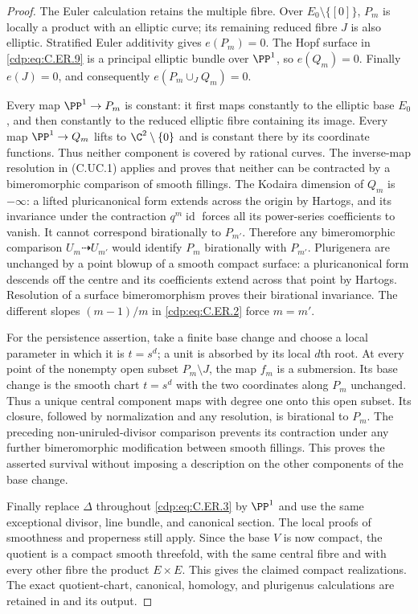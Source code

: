 \begin{proof}
The Euler calculation retains the multiple fibre. Over
$E_0\setminus\{[0]\}$, $P_m$ is locally a product with an elliptic
curve; its remaining reduced fibre $J$ is also elliptic.
Stratified Euler additivity gives $e(P_m)=0$.
The Hopf surface in \eqref{cdp:eq:C.ER.9} is a principal elliptic bundle over
$\PP^1$, so $e(Q_m)=0$. Finally $e(J)=0$, and consequently
$e(P_m\cup_JQ_m)=0$.

Every map $\PP^1\to P_m$ is constant: it first maps constantly
to the elliptic base $E_0$, and then constantly to the reduced
elliptic fibre containing its image. Every map $\PP^1\to Q_m$
lifts to $\C^2\setminus\{0\}$ and is constant there by its
coordinate functions. Thus neither component is covered by
rational curves. The inverse-map resolution in (C.UC.1) applies
and proves that neither can be contracted by a bimeromorphic
comparison of smooth fillings. The Kodaira dimension of $Q_m$
is $-\infty$: a lifted pluricanonical form extends across the
origin by Hartogs, and its invariance under the contraction
$q^m\operatorname{id}$ forces all its power-series coefficients
to vanish. It cannot correspond birationally to $P_{m'}$.
Therefore any bimeromorphic comparison $U_m\dashrightarrow U_{m'}$
would identify $P_m$ birationally with $P_{m'}$.
Plurigenera are unchanged by a point blowup of a smooth compact
surface: a pluricanonical form descends off the centre and its
coefficients extend across that point by Hartogs. Resolution of
a surface bimeromorphism proves their birational invariance.
The different slopes $(m-1)/m$ in \eqref{cdp:eq:C.ER.2} force $m=m'$.

For the persistence assertion, take a finite base change and choose
a local parameter in which it is $t=s^d$; a unit is absorbed by
its local $d$th root. At every point of the nonempty open subset
$P_m\setminus J$, the map $f_m$ is a submersion. Its base change
is the smooth chart $t=s^d$ with the two coordinates along $P_m$
unchanged. Thus a unique central component maps with degree one
onto this open subset. Its closure, followed by normalization and
any resolution, is birational to $P_m$. The preceding
non-uniruled-divisor comparison prevents its contraction under
any further bimeromorphic modification between smooth fillings.
This proves the asserted survival without imposing a description
on the other components of the base change.

Finally replace $\Delta$ throughout \eqref{cdp:eq:C.ER.3} by $\PP^1$ and use
the same exceptional divisor, line bundle, and canonical section.
The local proofs of smoothness and properness still apply. Since
the base $V$ is now compact, the quotient is a compact smooth
threefold, with the same central fibre and with every other fibre
the product $E\times E$. This gives the claimed compact realizations.
The exact quotient-chart, canonical, homology, and plurigenus
calculations are retained in  and
its output.
\end{proof}

